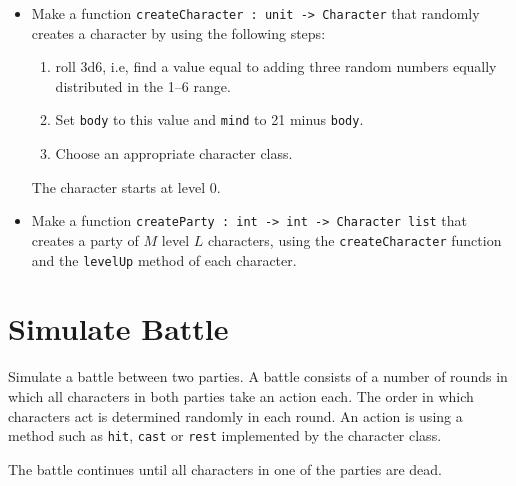\documentclass[a4paper]{article}
\begin{document}
\begin{itemize}

\item Make a function \texttt{createCharacter : unit -> Character}
  that randomly creates a character by using the following steps:

\begin{enumerate}
\item roll 3d6, i.e, find a value equal to adding three random numbers
  equally distributed in the 1--6 range.
\item Set \texttt{body} to this value and \texttt{mind} to 21 minus
  \texttt{body}.
\item Choose an appropriate character class.
\end{enumerate}

\noindent
The character starts at level 0.

\item Make a function \texttt{createParty : int -> int -> Character
  list} that creates a party of $M$ level $L$ characters, using the
  \texttt{createCharacter} function and the \texttt{levelUp} method of
  each character.

\end{itemize}

\section{Simulate Battle}

Simulate a battle between two parties.  A battle consists of a number
of rounds in which all characters in both parties take an action
each.  The order in which characters act is determined randomly in
each round.  An action is using a method such as \texttt{hit},
\texttt{cast} or \texttt{rest} implemented by the character class.

The battle continues until all characters in one of the parties are
dead.
\end{document}
